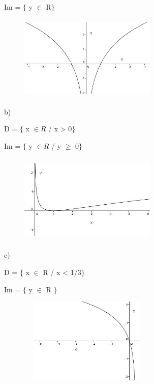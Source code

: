 \begin{respostas}{7}
Im = $ \{ $  y $ \in $ R$ \} $ 

\begin{figure}[H]
	\begin{Center}
		\includegraphics[width=2.57in,height=1.6in]{capitulos/logaritmos_e_funcao_logaritmica/media/image34.JPG}
	\end{Center}
\end{figure}

b)

D = $ \{ $  x  \(  \in R \)  / x > 0$ \} $ 

Im = $ \{ $  y  \(  \in R \)  / y $ \geq $  0$ \} $ 

\begin{figure}[H]
	\begin{Center}
		\includegraphics[width=2.57in,height=1.69in]{capitulos/logaritmos_e_funcao_logaritmica/media/image35.JPG}
	\end{Center}
\end{figure}

c)

D = $ \{ $ x $ \in $ R / x < 1/3$ \} $ 

Im = $ \{ $  y $ \in $ R $ \} $ 

\begin{figure}[H]
	\begin{Center}
		\includegraphics[width=2.55in,height=1.6in]{capitulos/logaritmos_e_funcao_logaritmica/media/image36.JPG}
	\end{Center}
\end{figure}


\end{respostas}

